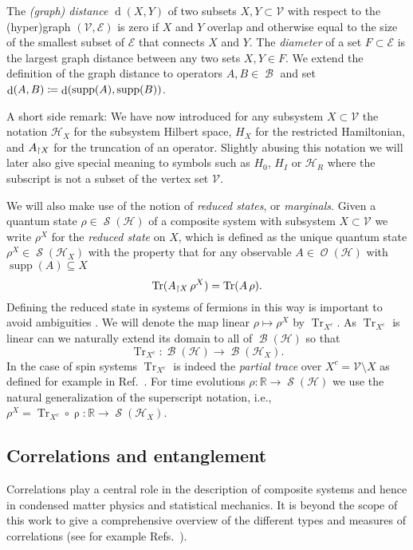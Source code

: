 \documentclass[a4paper,12pt,listof=totoc,index=totoc,bibliography=totoc,headsepline=false,headings=normal,BCOR16.153846mm,DIV12,headinclude,twoside,cleardoublepage=empty,numbers=noenddot,final]{scrreprt}
\theoremstyle{mystyle}
\numberwithin{equation}{section}
\numberwithin{figure}{section}
\numberwithin{lemma}{section}
\numberwithin{theorem}{section}
\numberwithin{corollary}{section}
\numberwithin{definition}{section}
\numberwithin{conjecture}{section}
\numberwithin{observation}{section}
\newcommand{\+}{\mkern2mu}
\newcommand{\coloneqq}{\mathrel{\vcentcolon\mkern-1.2mu=}} %
\renewcommand{\H}{H}
\newcommand{\Vset}{\mathcal{V}}
\newcommand{\Eset}{\mathcal{E}}
\newcommand{\compl}[1]{{{#1}^c}}
\newcommand{\trunc}[2]{{#1}_{\upharpoonright \mathnormal{#2}}}
\DeclareMathOperator{\1}{\mathds{1}}
\DeclareMathOperator{\Bop}{\mathcal{B}}
\DeclareMathOperator{\Obs}{\mathcal{O}}
\DeclareMathOperator{\Qst}{\mathcal{S}}
\DeclareMathOperator{\Tr}{Tr}
\DeclareMathOperator{\supp}{supp}
\DeclareMathOperator{\dist}{d}
\newcommand{\mc}[1]{\mathcal{#1}}
\newcommand{\mcH}{\mc{H}}
\newcommand{\mb}[1]{\mathbb{#1}}
\newcommand{\R}{\mb{R}}
\begin{document}
The \emph{(graph) distance} $\dist(X,Y)$ of two subsets $X,Y\subset \Vset$ with respect to the (hyper)graph $(\Vset,\Eset)$ is zero if $X$ and $Y$ overlap and otherwise equal to the size of the smallest subset of $\Eset$ that connects $X$ and $Y$.
The \emph{diameter} of a set $F \subset \Eset$ is the largest graph distance between any two sets $X,Y \in F$.
We extend the definition of the graph distance to operators $A,B \in \Bop$ and set $\dist(A,B) \coloneqq \dist(\supp(A), \supp(B))$.

A short side remark:
We have now introduced for any subsystem $X \subset \Vset$ the notation $\mcH_X$ for the subsystem Hilbert space, $\H_X$ for the restricted Hamiltonian, and $\trunc A X$ for the truncation of an operator.
Slightly abusing this notation we will later also give special meaning to symbols such as $\H_0$, $\H_I$ or $\mcH_R$ where the subscript is not a subset of the vertex set $\Vset$.

We will also make use of the notion of \emph{reduced states}, or \emph{marginals}.
Given a quantum state $\rho \in \Qst(\mcH)$ of a composite system with subsystem $X \subset \Vset$ we write $\rho^X$ for the \emph{reduced state} on $X$, which is defined as the unique quantum state $\rho^X \in \Qst(\mcH_X)$ with the property that for any observable $A \in \Obs(\mcH)$ with $\supp(A) \subseteq X$
\begin{equation} \label{eq:reducedstate}
  \Tr(\trunc A X \,\rho^X) = \Tr(A\,\rho) .
\end{equation}
Defining the reduced state in systems of fermions in this way is important to avoid ambiguities \cite{Friis2013}.
We will denote the map linear $\rho \mapsto \rho^X$ by $\Tr_{\compl{X}}$.
As $\Tr_{\compl{X}}$ is linear can we naturally extend its domain to all of $\Bop(\mcH)$ so that
\begin{equation} \label{eq:partialtrace}
  \Tr_{\compl{X}} \colon \Bop(\mcH) \to \Bop(\mcH_X) .
\end{equation}
In the case of spin systems $\Tr_{\compl{X}}$ is indeed the \emph{partial trace} over $\compl X = \Vset\setminus X$ as defined for example in Ref.~\cite{nielsenchuang}.
For time evolutions $\rho \colon \R \to \Qst(\mcH)$ we use the natural generalization of the superscript notation, i.e., $\rho^X = \Tr_{\compl{X}} \circ \mathop\rho \colon \R \to \Qst(\mcH_X)$.


\subsection{Correlations and entanglement}
\label{sec:correlationsandmomemts}
%
Correlations play a central role in the description of composite systems and hence in condensed matter physics and statistical mechanics.
It is beyond the scope of this work to give a comprehensive overview of the different types and measures of correlations (see for example Refs.~\cite{Kastoryano2011,Kastoryano2013,nielsenchuang,Plenio07}).
\end{document}
